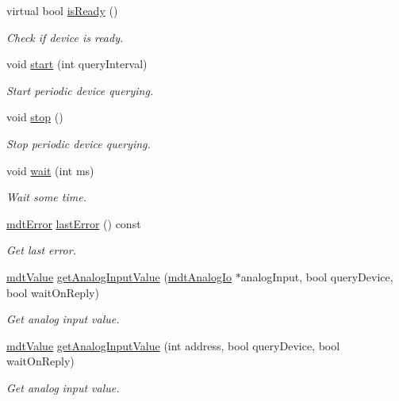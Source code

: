 \begin{DoxyCompactItemize}
virtual bool \hyperlink{classmdt_device_a8887a1142d3d3be673c18cf3376e7af4}{is\-Ready} ()
\begin{DoxyCompactList}\small\item\em Check if device is ready. \end{DoxyCompactList}\item 
void \hyperlink{classmdt_device_a721c5bf2cfa0eef5304333f08da182f7}{start} (int query\-Interval)
\begin{DoxyCompactList}\small\item\em Start periodic device querying. \end{DoxyCompactList}\item 
void \hyperlink{classmdt_device_adc7ff8f01d68506283a3d0cc6bc25407}{stop} ()
\begin{DoxyCompactList}\small\item\em Stop periodic device querying. \end{DoxyCompactList}\item 
void \hyperlink{classmdt_device_a6def09a050cbf3521b615e8300c42f66}{wait} (int ms)
\begin{DoxyCompactList}\small\item\em Wait some time. \end{DoxyCompactList}\item 
\hyperlink{classmdt_error}{mdt\-Error} \hyperlink{classmdt_device_a79ca328ff9e9f413a38c1cc9c9267cee}{last\-Error} () const 
\begin{DoxyCompactList}\small\item\em Get last error. \end{DoxyCompactList}\item 
\hyperlink{classmdt_value}{mdt\-Value} \hyperlink{classmdt_device_ab828764660ba53ffce1995901ddf5a0a}{get\-Analog\-Input\-Value} (\hyperlink{classmdt_analog_io}{mdt\-Analog\-Io} $\ast$analog\-Input, bool query\-Device, bool wait\-On\-Reply)
\begin{DoxyCompactList}\small\item\em Get analog input value. \end{DoxyCompactList}\item 
\hyperlink{classmdt_value}{mdt\-Value} \hyperlink{classmdt_device_ad6a9d73cd51ce21f69dc8e4646d4fcfe}{get\-Analog\-Input\-Value} (int address, bool query\-Device, bool wait\-On\-Reply)
\begin{DoxyCompactList}\small\item\em Get analog input value. \end{DoxyCompactList}\item 

\end{DoxyCompactItemize}
